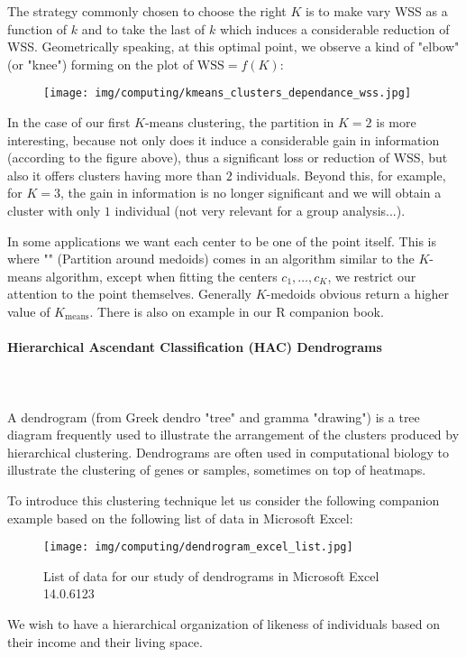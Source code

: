 	The strategy commonly chosen to choose the right $K$ is to make vary WSS as a function of $k$ and to take the last of $k$ which induces a considerable reduction of WSS. Geometrically speaking, at this optimal point, we observe a kind of "elbow" (or "knee") forming on the plot of $\text{WSS}=f(K)$:
	\begin{figure}[H]
		\centering
		\texttt{[image: img/computing/kmeans\_clusters\_dependance\_wss.jpg]}
	\end{figure}
	In the case of our first $K$-means clustering, the partition in $K=2$ is more interesting, because not only does it induce a considerable gain in information (according to the figure above), thus a significant loss or reduction of WSS, but also it offers clusters having more than $2$ individuals. Beyond this, for example, for $K=3$, the gain in information is no longer significant and we will obtain a cluster with only $1$ individual (not very relevant for a group analysis...).
	\begin{tcolorbox}[title=Remark,colframe=black,arc=10pt]
	In some applications we want each center to be one of the point itself. This is where "" (Partition around medoids) comes in an algorithm similar to the $K$-means algorithm, except when fitting the centers $c_1,\ldots,c_K$, we restrict our attention to the point themselves. Generally $K$-medoids obvious return a higher value of $K_{\text{means}}$. There is also on example in our R companion book.
	\end{tcolorbox}

	
	\paragraph{Hierarchical Ascendant Classification (HAC) Dendrograms}\mbox{}\\\\
	A dendrogram (from Greek dendro "tree" and gramma "drawing") is a tree diagram frequently used to illustrate the arrangement of the clusters produced by hierarchical clustering. Dendrograms are often used in computational biology to illustrate the clustering of genes or samples, sometimes on top of heatmaps.
	
	To introduce this clustering technique let us consider the following companion example based on the following list of data in Microsoft Excel:
	\begin{figure}[H]
		\centering
		\texttt{[image: img/computing/dendrogram\_excel\_list.jpg]}
		\caption[]{List of data for our study of dendrograms in Microsoft Excel 14.0.6123}
	\end{figure}
	We wish to have a hierarchical organization of likeness of individuals based on their income and their living space. 

